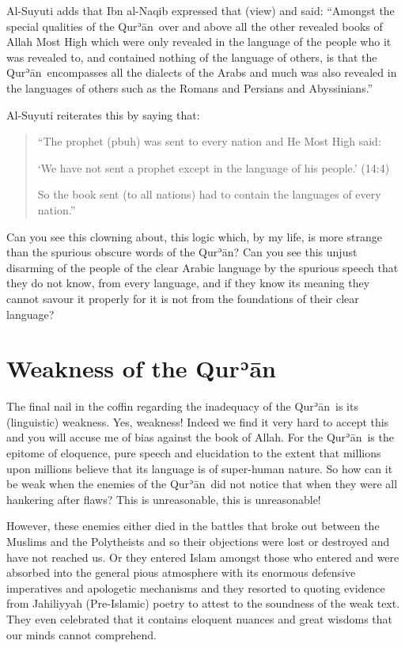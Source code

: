 \documentclass[12pt]{memoir}
\def\´{ʾ} %
\def \Quran{Qur\-\´ān} %
\def\–{-\hskip0pt}
\newcommand{\QRef}[1]{{\color{darkblue}#1}}
\let \fnmark=\footnotemark
\let \fntext=\footnotetext
\begin{document}
Al-Suyuti adds that Ibn al-Naqib expressed that (view) and said:
“Amongst the special qualities of the \Quran\ over
and above all the other revealed books of Allah Most High
which were only revealed in the language of the people who it was revealed to,
and contained nothing of the language of others,
is that the \Quran\ encompasses all the dialects of the Arabs
and much was also revealed in the languages of others
such as the Romans and Persians and Abyssinians.”\fnmark

\fntext{Ibidem 1/143–142.}

Al-Suyuti reiterates this by saying that:

\begin{quote}
“The prophet (pbuh) was sent to every nation and He Most High said:

‘We have not sent a prophet except in the language of his people.’
(\QRef{14:4})

So the book sent (to all nations) had to contain
the languages of every nation.”\fnmark
\end{quote}

\fntext{Ibidem 1/143.}

Can you see this clowning about, this logic which, by my life,
is more strange than the spurious obscure words of the \Quran?
Can you see this unjust disarming of the people of the clear Arabic language
by the spurious speech that they do not know, from every language,
and if they know its meaning they cannot savour it properly
for it is not from the foundations of their clear language?


\section{Weakness of the \Quran}

The final nail in the coffin regarding the inadequacy of the \Quran\
is its (linguistic) weakness.
Yes, weakness! Indeed we find it very hard to accept this
and you will accuse me of bias against the book of Allah.
For the \Quran\ is the epitome of eloquence, pure speech and elucidation
to the extent that millions upon millions believe
that its language is of super\–human nature.
So how can it be weak when the enemies of the \Quran\ did not notice
that when they were all hankering after flaws?
This is unreasonable, this is unreasonable!

However, these enemies either died in the battles that broke out
between the Muslims and the Polytheists and so their objections were lost
or destroyed and have not reached us.
Or they entered Islam amongst those who entered and were absorbed
into the general pious atmosphere with its enormous defensive imperatives
and apologetic mechanisms and they resorted to quoting evidence from
Jahiliyyah (Pre\–Islamic) poetry to attest to the soundness of the weak text.
They even celebrated that it contains eloquent nuances and great wisdoms
that our minds cannot comprehend.
\end{document}
